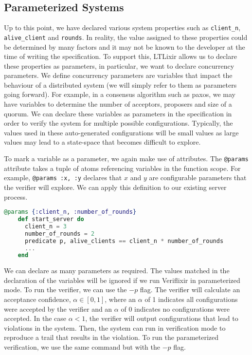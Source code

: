 \subsection{Parameterized Systems}
Up to this point, we have declared various system properties such as \texttt{client\_n}, \texttt{alive\_client} and \texttt{rounds}. In reality, the value assigned to these properties could be determined by many factors and it may not be known to the developer at the time of writing the specification. To support this, LTLixir allows us to declare these properties as parameters, in particular, we want to declare concurrency parameters. We define concurrency parameters are variables that impact the behaviour of a distributed system (we will simply refer to them as parameters going forward). For example, in a consensus algorithm such as paxos, we may have variables to determine the number of acceptors, proposers and size of a quorum. We can declare these variables as parameters in the specification in order to verify the system for multiple possible configurations. Typically, the values used in these auto-generated configurations will be small values as large values may lead to a state-space that becomes difficult to explore.
\par
To mark a variable as a parameter, we again make use of attributes. The \texttt{@params} attribute takes a tuple of atoms referencing variables in the function scope. For example, \texttt{@params {:x, :y}} declares that $x$ and $y$ are configurable parameters that the verifier will explore. We can apply this definition to our existing server process.
\begin{lstlisting}[language=Elixir, xleftmargin=.3\linewidth, caption={Example of declaring concurrency parameters in specification.}]
    @params {:client_n, :number_of_rounds}
    def start_server do
      client_n = 3
      number_of_rounds = 2
      predicate p, alive_clients == client_n * number_of_rounds
      ...
    end
\end{lstlisting}
We can declare as many parameters as required. The values matched in the declaration of the variables will be ignored if we run Veriflixir in parameterized mode. To run the verifier, we can use the $-p$ flag. The verifier will calculate an acceptance confidence, \(\alpha \in [0, 1]\), where an $\alpha$ of 1 indicates all configurations were accepted by the verifier and an $\alpha$ of 0 indicates no configurations were accepted. In the case $\alpha < 1$, the verifier will output configurations that lead to violations in the system. Then, the system can run in verification mode to reproduce a trail that results in the violation. To run the parameterized verification, we use the same command but with the $-p$ flag.
